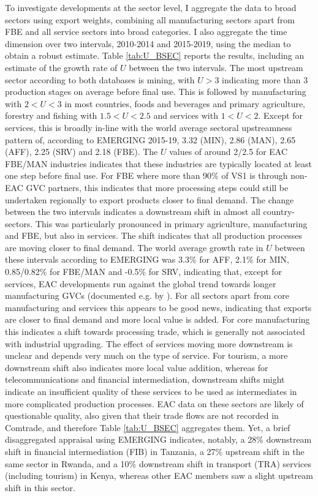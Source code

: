 \documentclass[a4paper]{article}
\begin{document}
To investigate developments at the sector level, I aggregate the data to broad sectors using export weights, combining all manufacturing sectors apart from FBE and all service sectors into broad categories. I also aggregate the time dimension over two intervals, 2010-2014 and 2015-2019, using the median to obtain a robust estimate. Table \ref{tab:U_BSEC} reports the results, including an estimate of the growth rate of $U$ between the two intervals. The most upstream sector according to both databases is mining, with $U>3$ indicating more than 3 production stages on average before final use. This is followed by manufacturing with $2 <U <3$ in most countries, foods and beverages and primary agriculture, forestry and fishing with $1.5 <U <2.5$ and services with $1 <U <2$. Except for services, this is broadly in-line with the world average sectoral upstreamness pattern of, according to EMERGING 2015-19, 3.32 (MIN), 2.86 (MAN), 2.65 (AFF), 2.25 (SRV) and 2.18 (FBE). The $U$ values of around 2/2.5 for EAC FBE/MAN industries indicates that these industries are typically located at least one step before final use. For FBE where more than 90\% of VS1 is through non-EAC GVC partners, this indicates that more processing steps could still be undertaken regionally to export products closer to final demand. The change between the two intervals indicates a downstream shift in almost all country-sectors. This was particularly pronounced in primary agriculture, manufacturing and FBE, but also in services. The shift indicates that all production processes are moving closer to final demand. The world average growth rate in $U$ between these intervals according to EMERGING was 3.3\% for AFF, 2.1\% for MIN, 0.85/0.82\% for FBE/MAN and -0.5\% for SRV, indicating that, except for services, EAC developments run against the global trend towards longer manufacturing GVCs (documented e.g. by \citet{antras2018measurement}). For all sectors apart from core manufacturing and services this appears to be good news, indicating that exports are closer to final demand and more local value is added. For core manufacturing this indicates a shift towards processing trade, which is generally not associated with industrial upgrading. The effect of services moving more downstream is unclear and depends very much on the type of service. For tourism, a more downstream shift also indicates more local value addition, whereas for telecommunications and financial intermediation, downstream shifts might indicate an insufficient quality of these services to be used as intermediates in more complicated production processes.    EAC data on these sectors are likely of questionable quality, also given that their trade flows are not recorded in Comtrade, and therefore Table \ref{tab:U_BSEC} aggregates them. Yet, a brief disaggregated appraisal using EMERGING indicates, notably, a 28\% downstream shift in financial intermediation (FIB) in Tanzania, a 27\% upstream shift in the same sector in Rwanda, and a 10\% downstream shift in transport (TRA) services (including tourism) in Kenya, whereas other EAC members saw a slight upstream shift in this sector. 
\end{document}
